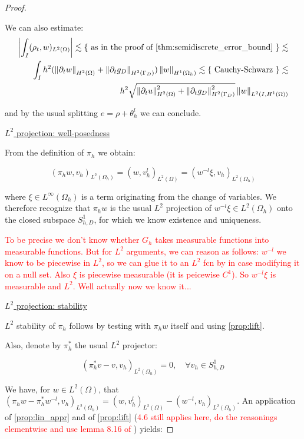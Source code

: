 \documentclass[english,a4paper,10pt,oneside]{scrbook}	%
\theoremstyle{break}
\newenvironment{mproof}[1][\proofname]{%
  \begin{proof}[#1]$ $\par\nobreak\ignorespaces
}{%
  \end{proof}
}
\renewcommand*{\proofname}{Proof}
\theoremstyle{remark}
\newcommand{\norm}[1]{\left\lVert#1\right\rVert}
\newcommand{\ind}[1]{\{\text{ #1 }\}}
\begin{document}
\begin{mproof}
We can also estimate:
\begin{align*}
\left | \int_I (\rho_t, w)_{L^2(\Omega)}\right |\lesssim \ind{as in the proof of \cref{thm:semidiscrete_error_bound}}\lesssim\\\int_I
h^2 (\norm{\partial_t w}_{H^2(\Omega)} + \norm{\partial_t g_D}_{H^2(\Gamma_D)})\norm{w}_{H^1(\Omega_h)} \lesssim \ind{Cauchy-Schwarz}\lesssim\\
h^2 \sqrt{\norm{\partial_t u}_{H^2(\Omega)}^2 + \norm{\partial_t g_D}_{H^2(\Gamma_D)}^2}\norm{w}_{L^2(I,H^1(\Omega))}
\end{align*}

and by the usual splitting $e=\rho + \theta_h^l$ we can conclude.

\underline{$L^2$ projection: well-posedness}

From the definition of $\pi_h$ we obtain:

$$(\pi_h w, v_h)_{L^2(\Omega_h)}=(w, v_h^l)_{L^2(\Omega)}  = (w^{-l} \xi, v_h)_{L^2(\Omega_h)}$$

where $\xi \in L^\infty(\Omega_h)$ is a term originating from the change of variables. We therefore recognize that $\pi_h w$ is the usual $L^2$ projection of $w^{-l} \xi\in L^2(\Omega_h)$ onto the closed subspace $S^1_{h,D}$, for which we know existence and uniqueness.

\textcolor{red}{To be precise we don't know whether $G_h$ takes measurable functions into measurable functions. But for $L^2$ arguments, we can reason as follows: $w^{-l}$ we know to be piecewise in $L^2$, so we can glue it to an $L^2$ fcn by in case modifying it on a null set. Also $\xi$ is piecewise measurable (it is peicewise $C^1$). So $w^{-l}\xi$ is measurable and $L^2$. Well actually now we know it...}

\underline{$L^2$ projection: stability}

$L^2$ stability of $\pi_h$ follows by testing with $\pi_h w$ itself and using \cref{prop:lift}.

Also, denote by $\pi_h^*$ the usual $L^2$ projector:

$$(\pi_h^* v - v, v_h)_{L^2(\Omega_h)}=0,\quad \forall  v_h \in S^1_{h,D}$$

We have, for $w \in L^2(\Omega)$, that $(\pi_h w - \pi_h^* w^{-l}, v_h)_{L^2(\Omega_h)} = (w, v_h^l)_{L^2(\Omega)} - (w^{-l}, v_h)_{L^2(\Omega_h)}$. An application of \cref{prop:lin_appr} and of \cref{prop:lift} (\textcolor{red}{4.6 still applies here, do the reasonings elementwise and use lemma 8.16 of \cite{ranner}}) yields:


\end{mproof}
\end{document}
